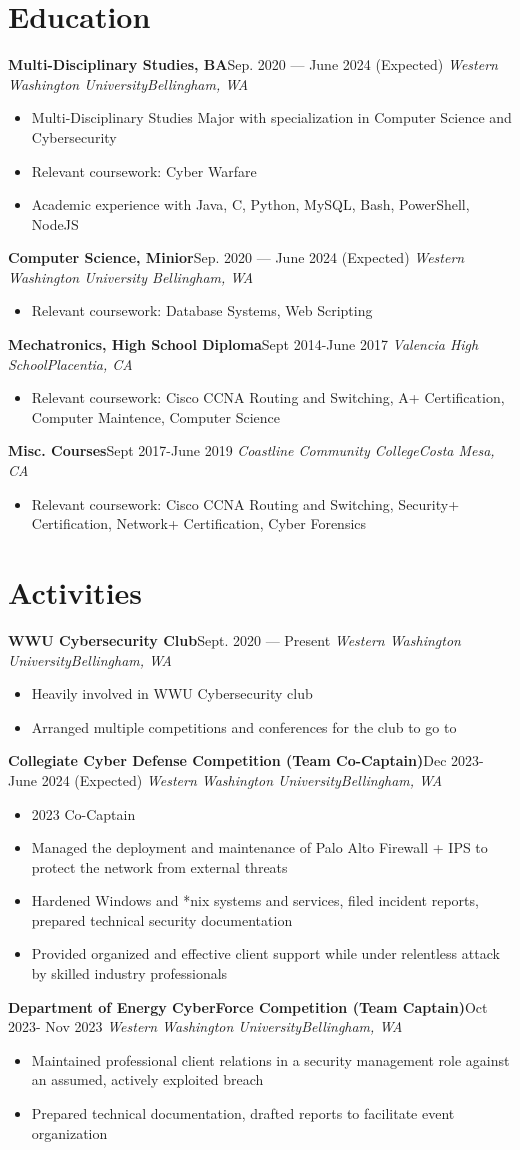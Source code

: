 \documentclass{article}
\newcommand{\topLevelItem}[4]{
    \textbf{#1}\hfill #4\newline
    \emph{#2\hfill #3}\newline
    \vspace{-18pt}\begin{itemize}
}
\newcommand{\topLevelItemEnd}{\end{itemize}\vspace{5pt}}
\newcommand{\lowLevelItem}[1]{
    \item\small{#1}\vspace{-8pt}
}
\begin{document}
    \section*{Education}
        \topLevelItem{Multi-Disciplinary Studies, BA}{Western Washington University}{Bellingham, WA}{Sep. 2020 — June 2024 (Expected)}
            \lowLevelItem{Multi-Disciplinary Studies Major with specialization in Computer Science and Cybersecurity}
            \lowLevelItem{Relevant coursework: Cyber Warfare}
            \lowLevelItem{Academic experience with Java, C, Python, MySQL, Bash, PowerShell, NodeJS}
        \topLevelItemEnd
        \topLevelItem{Computer Science, Minior}{Western Washington University }{Bellingham, WA}{Sep. 2020 — June 2024 (Expected)}
            \lowLevelItem{Relevant coursework: Database Systems, Web Scripting}
        \topLevelItemEnd
        \topLevelItem{Mechatronics, High School Diploma}{Valencia High School}{Placentia, CA}{Sept 2014-June 2017}
            \lowLevelItem{Relevant coursework: Cisco CCNA Routing and Switching, A+ Certification, Computer Maintence, Computer Science}
        \topLevelItemEnd
        \topLevelItem{Misc. Courses}{Coastline Community College}{Costa Mesa, CA}{Sept 2017-June 2019}
            \lowLevelItem{Relevant coursework: Cisco CCNA Routing and Switching, Security+ Certification, Network+ Certification, Cyber Forensics}
        \topLevelItemEnd
        
    \section*{Activities}
        \topLevelItem{WWU Cybersecurity Club}{Western Washington University}{Bellingham, WA}{Sept. 2020 — Present}
            \lowLevelItem{Heavily involved in WWU Cybersecurity club}
            \lowLevelItem{Arranged multiple competitions and conferences for the club to go to}
        \topLevelItemEnd
        \topLevelItem{Collegiate Cyber Defense Competition (Team Co-Captain)}{Western Washington University}{Bellingham, WA}{Dec 2023-June 2024 (Expected)}
            \lowLevelItem{2023 Co-Captain}
            \lowLevelItem{Managed the deployment and maintenance of Palo Alto Firewall + IPS to protect the network from external threats}
            \lowLevelItem{Hardened Windows and *nix systems and services, filed incident reports, prepared technical security documentation}
            \lowLevelItem{Provided organized and effective client support while under relentless attack by skilled industry professionals}
        \topLevelItemEnd
        \topLevelItem{Department of Energy CyberForce Competition (Team Captain)}{Western Washington University}{Bellingham, WA}{Oct 2023- Nov 2023}
            \lowLevelItem{Maintained professional client relations in a security management role against an assumed, actively exploited breach}
            \lowLevelItem{Prepared technical documentation, drafted reports to facilitate event organization}
        \topLevelItemEnd
        
\end{document}
